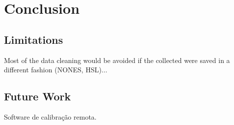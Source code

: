 
\chapter{Conclusion}
\label{chapter:conclusion}
 
\section{Limitations}
\label{sec:limitations}
Most of the data cleaning would be avoided if the collected were saved in a different fashion (NONES, HSL)...

\section{Future Work}
\label{sec:future_work}
Software de calibração remota.
